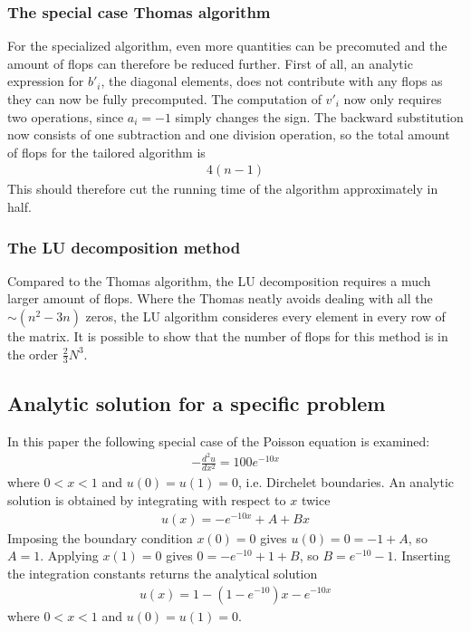 \documentclass[aps,prl,reprint,toc]{revtex4-1}
\begin{document}
\subsubsection{The special case Thomas algorithm}
For the specialized algorithm, even more quantities can be precomuted and the
amount of flops can therefore be reduced further. First of all, an analytic
expression for $b'_i$, the diagonal elements, does not contribute with any flops
as they can now be fully precomputed. The computation of $v'_i$ now only requires two
operations, since $a_i = -1$ simply changes the sign. The backward substitution
now consists of one subtraction and one division operation, so the total amount of
flops for the tailored algorithm is
\begin{align}
  4(n-1)
\end{align}
This should therefore cut the running time of the algorithm approximately in half.
\subsubsection{The LU decomposition method}
Compared to the Thomas algorithm, the LU decomposition requires a much larger
amount of flops. Where the Thomas neatly avoids dealing with all the $\sim (n^2 - 3n)$
zeros, the LU algorithm consideres every element in every row of the matrix. It is
possible to show that the number of flops for this method is in the order $\frac{2}{3}N^3$.

\subsection{Analytic solution for a specific problem}
In this paper the following special case of the Poisson equation is examined:
\begin{align}
  - \frac{d^2 u}{dx^2} = 100 e^{-10x}
\end{align}
where $0 < x < 1$ and $u(0) = u(1) = 0$, i.e. Dirchelet boundaries. An analytic
solution is obtained by integrating with respect to $x$ twice
\begin{align*}
  u(x) = -e^{-10x} + A + Bx
\end{align*}
Imposing the boundary condition $x(0) = 0$ gives $u(0) = 0 = -1 + A$, so
$A = 1$. Applying $x(1) = 0$ gives $0 = -e^{-10} + 1 + B$, so $B = e^{-10} - 1$.
Inserting the integration constants returns the analytical solution
\begin{align}
  u(x) = 1 - (1 - e^{-10})x - e^{-10x}
\end{align}
where $0 < x < 1$ and $u(0) = u(1) = 0$.
\end{document}
